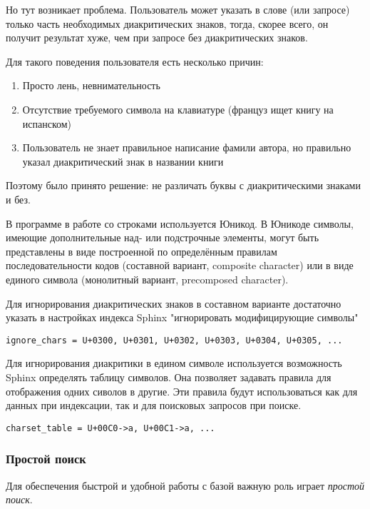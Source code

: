 Но тут возникает проблема. Пользователь может указать в слове (или запросе) только часть необходимых диакритических знаков, тогда, скорее всего, он получит результат хуже, чем при запросе без диакритических знаков. 

Для такого поведения пользователя есть несколько причин:
\begin{enumerate}
    \item Просто лень, невнимательность 
    \item Отсутствие требуемого символа на клавиатуре (француз ищет книгу на испанском) 
    \item Пользователь не знает правильное написание фамили автора, но правильно указал диакритический знак в названии книги 
\end{enumerate}

Поэтому было принято решение: не различать буквы с диакритическими знаками и без.

В программе в работе со строками используется Юникод.
В Юникоде символы, имеющие дополнительные над- или подстрочные элементы, 
могут быть представлены в виде построенной по определённым правилам последовательности кодов (составной вариант, composite character) 
или в виде единого символа (монолитный вариант, precomposed character).

Для игнорирования диакритических знаков в составном варианте достаточно указать в настройках индекса Sphinx "игнорировать модифицирующие символы"
\begin{verbatim}
ignore_chars = U+0300, U+0301, U+0302, U+0303, U+0304, U+0305, ...
\end{verbatim}
Для игнорирования диакритики в едином символе используется возможность Sphinx определять таблицу символов. Она позволяет задавать правила для отображения одних сиволов в другие.
Эти правила будут использоваться как для данных при индексации, так и для поисковых запросов при поиске.
\begin{verbatim}
charset_table = U+00C0->a, U+00C1->a, ...
\end{verbatim}

\subsubsection{Простой поиск}

Для обеспечения быстрой и удобной работы с базой важную роль играет {\em простой поиск}. 
